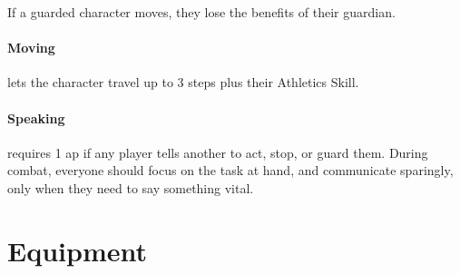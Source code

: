 \begin{multicols}{2}
If a guarded character moves, they lose the benefits of their guardian.

\paragraph{Moving}
\label{moving}
lets the character travel up to 3 steps plus their Athletics Skill.

\paragraph{Speaking}
requires 1 \gls{ap} if any player tells another to act, stop, or guard them.
During combat, everyone should focus on the task at hand, and communicate sparingly, only when they need to say something vital.

\end{multicols}


\section{Equipment}

